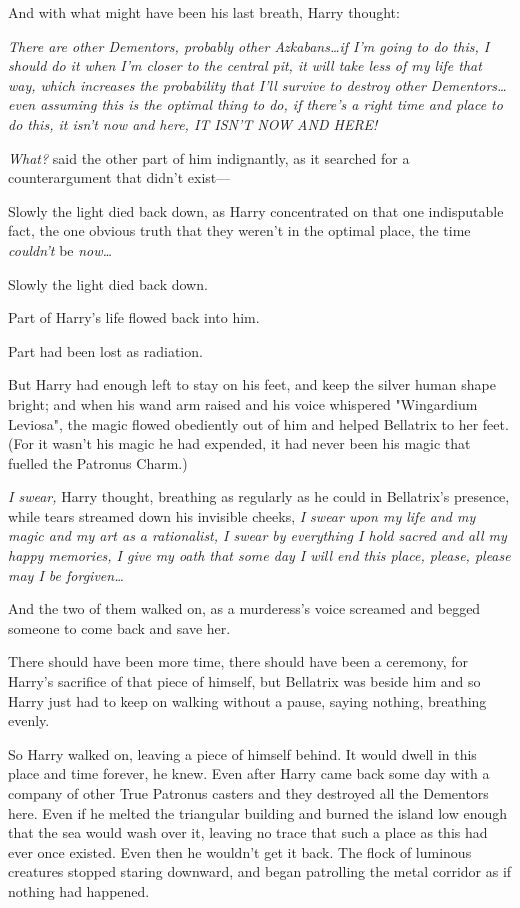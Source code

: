 And with what might have been his last breath, Harry thought:

\emph{There are other Dementors, probably other Azkabans…if I'm going
to do this, I should do it when I'm closer to the central pit, it will take
less of my life that way, which increases the probability that I'll survive to
destroy other Dementors…even assuming this is the optimal thing to do,
if there's a right time and place to do this, it isn't now and here, IT ISN'T
NOW AND HERE!}

\emph{What?} said the other part of him indignantly, as it searched for a
counterargument that didn't exist—

Slowly the light died back down, as Harry concentrated on that one indisputable
fact, the one obvious truth that they weren't in the optimal place, the time
\emph{couldn't} be \emph{now…}

Slowly the light died back down.

Part of Harry's life flowed back into him.

Part had been lost as radiation.

But Harry had enough left to stay on his feet, and keep the silver human shape
bright; and when his wand arm raised and his voice whispered "Wingardium
Leviosa", the magic flowed obediently out of him and helped Bellatrix to her
feet. (For it wasn't his magic he had expended, it had never been his magic
that fuelled the Patronus Charm.)

\emph{I swear,} Harry thought, breathing as regularly as he could in
Bellatrix's presence, while tears streamed down his invisible cheeks, \emph{I
swear upon my life and my magic and my art as a rationalist, I swear by
everything I hold sacred and all my happy memories, I give my oath that some day
I will end this place, please, please may I be forgiven…}

And the two of them walked on, as a murderess's voice screamed and begged
someone to come back and save her.

There should have been more time, there should have been a ceremony, for
Harry's sacrifice of that piece of himself, but Bellatrix was beside him and so
Harry just had to keep on walking without a pause, saying nothing, breathing
evenly.

So Harry walked on, leaving a piece of himself behind. It would dwell in this
place and time forever, he knew. Even after Harry came back some day with a
company of other True Patronus casters and they destroyed all the Dementors
here. Even if he melted the triangular building and burned the island low
enough that the sea would wash over it, leaving no trace that such a place as
this had ever once existed. Even then he wouldn't get it back.
\later
The flock of luminous creatures stopped staring downward, and began patrolling
the metal corridor as if nothing had happened.

